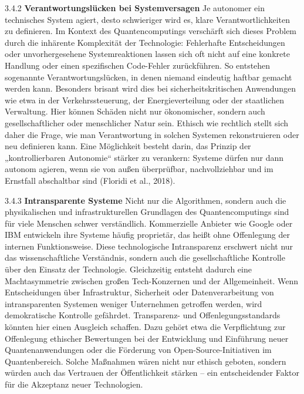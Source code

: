 3.4.2 \textbf{Verantwortungslücken bei Systemversagen}
 Je autonomer ein technisches System agiert, desto schwieriger wird es, klare Verantwortlichkeiten zu definieren. Im Kontext des Quantencomputings verschärft sich dieses Problem durch die inhärente Komplexität der Technologie: Fehlerhafte Entscheidungen oder unvorhergesehene Systemreaktionen lassen sich oft nicht auf eine konkrete Handlung oder einen spezifischen Code-Fehler zurückführen. So entstehen sogenannte Verantwortungslücken, in denen niemand eindeutig haftbar gemacht werden kann.
Besonders brisant wird dies bei sicherheitskritischen Anwendungen wie etwa in der Verkehrssteuerung, der Energieverteilung oder der staatlichen Verwaltung. Hier können Schäden nicht nur ökonomischer, sondern auch gesellschaftlicher oder menschlicher Natur sein. Ethisch wie rechtlich stellt sich daher die Frage, wie man Verantwortung in solchen Systemen rekonstruieren oder neu definieren kann. Eine Möglichkeit besteht darin, das Prinzip der „kontrollierbaren Autonomie“ stärker zu verankern: Systeme dürfen nur dann autonom agieren, wenn sie von außen überprüfbar, nachvollziehbar und im Ernstfall abschaltbar sind (Floridi et al., 2018).
 
3.4.3 \textbf{Intransparente Systeme }
Nicht nur die Algorithmen, sondern auch die physikalischen und infrastrukturellen Grundlagen des Quantencomputings sind für viele Menschen schwer verständlich. Kommerzielle Anbieter wie Google oder IBM entwickeln ihre Systeme häufig proprietär, das heißt ohne Offenlegung der internen Funktionsweise. Diese technologische Intransparenz erschwert nicht nur das wissenschaftliche Verständnis, sondern auch die gesellschaftliche Kontrolle über den Einsatz der Technologie.
Gleichzeitig entsteht dadurch eine Machtasymmetrie zwischen großen Tech-Konzernen und der Allgemeinheit. Wenn Entscheidungen über Infrastruktur, Sicherheit oder Datenverarbeitung von intransparenten Systemen weniger Unternehmen getroffen werden, wird demokratische Kontrolle gefährdet. Transparenz- und Offenlegungsstandards könnten hier einen Ausgleich schaffen. Dazu gehört etwa die Verpflichtung zur Offenlegung ethischer Bewertungen bei der Entwicklung und Einführung neuer Quantenanwendungen oder die Förderung von Open-Source-Initiativen im Quantenbereich. Solche Maßnahmen wären nicht nur ethisch geboten, sondern würden auch das Vertrauen der Öffentlichkeit stärken – ein entscheidender Faktor für die Akzeptanz neuer Technologien.
 
